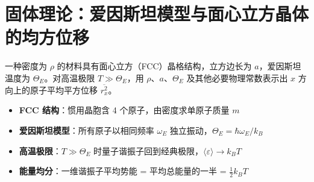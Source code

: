 \section{固体理论：爱因斯坦模型与面心立方晶体的均方位移}
\label{sec:einstein-msd}

\begin{modelbox}
一种密度为 $\rho$ 的材料具有面心立方（FCC）晶格结构，立方边长为 $a$，爱因斯坦温度为 $\Theta_E$。对高温极限 $T\gg\Theta_E$，用 $\rho$、$a$、$\Theta_E$ 及其他必要物理常数表示出 $x$ 方向上的原子平均平方位移 $\overline{r_x^2}$。
\end{modelbox}

\begin{tipbox}[考点快速分析]
\begin{itemize}
    \item \textbf{FCC 结构}：惯用晶胞含 4 个原子，由密度求单原子质量 $m$
    \item \textbf{爱因斯坦模型}：所有原子以相同频率 $\omega_E$ 独立振动，$\Theta_E=\hbar\omega_E/k_B$
    \item \textbf{高温极限}：$T\gg\Theta_E$ 时量子谐振子回到经典极限，$\langle\varepsilon\rangle\to k_BT$
    \item \textbf{能量均分}：一维谐振子平均势能 = 平均总能量的一半 = $\frac12 k_BT$
\end{itemize}
\end{tipbox}

